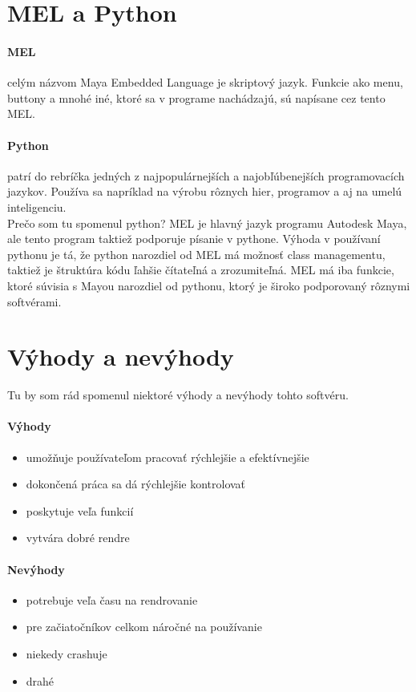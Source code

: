 \documentclass[10pt,oneside,slovak,a4paper]{article}
\begin{document}
\section{MEL a Python} \label{python}
\paragraph{MEL}
celým názvom Maya Embedded Language je skriptový jazyk. Funkcie ako menu, buttony a mnohé iné, ktoré sa v programe nachádzajú, sú napísane cez tento MEL.
\paragraph{Python}
patrí do rebríčka jedných z najpopulárnejších a najobľúbenejších programovacích jazykov. Používa sa napríklad na výrobu rôznych hier, programov a aj na umelú inteligenciu.\\

Prečo som tu spomenul python? MEL je hlavný jazyk programu Autodesk Maya, ale tento program taktiež podporuje písanie v pythone. Výhoda v používaní pythonu je tá, že python narozdiel od MEL má možnosť class managementu, taktiež je štruktúra kódu ľahšie čítateľná a zrozumiteľná. MEL má iba funkcie, ktoré súvisia s Mayou narozdiel od pythonu, ktorý je široko podporovaný rôznymi softvérami.\cite{evaluationmaya}



\section{Výhody a nevýhody} \label{vyhnevyh}
Tu by som rád spomenul niektoré výhody a nevýhody tohto softvéru.

\paragraph{Výhody}
\begin{itemize}
\item umožňuje používateľom pracovať rýchlejšie a efektívnejšie
\item dokončená práca sa dá rýchlejšie kontrolovať\cite{educbaa2021}
\item poskytuje veľa funkcií
\item vytvára dobré rendre
\end{itemize}

\paragraph{Nevýhody}
\begin{itemize}
\item potrebuje veľa času na rendrovanie
\item pre začiatočníkov celkom náročné na používanie
\item niekedy crashuje
\item drahé
\end{itemize}
\end{document}
